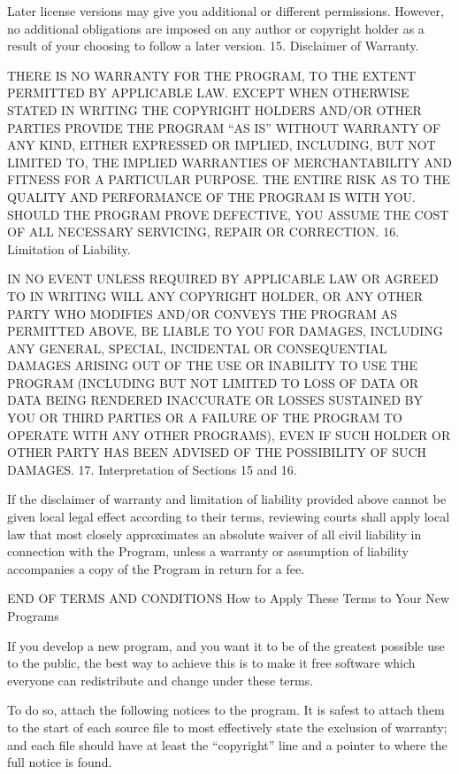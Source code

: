 {\begin{multicols}{4}
Later license versions may give you additional or different permissions. However, no additional obligations are imposed on any author or copyright holder as a result of your choosing to follow a later version.
15. Disclaimer of Warranty.

THERE IS NO WARRANTY FOR THE PROGRAM, TO THE EXTENT PERMITTED BY APPLICABLE LAW. EXCEPT WHEN OTHERWISE STATED IN WRITING THE COPYRIGHT HOLDERS AND/OR OTHER PARTIES PROVIDE THE PROGRAM “AS IS” WITHOUT WARRANTY OF ANY KIND, EITHER EXPRESSED OR IMPLIED, INCLUDING, BUT NOT LIMITED TO, THE IMPLIED WARRANTIES OF MERCHANTABILITY AND FITNESS FOR A PARTICULAR PURPOSE. THE ENTIRE RISK AS TO THE QUALITY AND PERFORMANCE OF THE PROGRAM IS WITH YOU. SHOULD THE PROGRAM PROVE DEFECTIVE, YOU ASSUME THE COST OF ALL NECESSARY SERVICING, REPAIR OR CORRECTION.
16. Limitation of Liability.

IN NO EVENT UNLESS REQUIRED BY APPLICABLE LAW OR AGREED TO IN WRITING WILL ANY COPYRIGHT HOLDER, OR ANY OTHER PARTY WHO MODIFIES AND/OR CONVEYS THE PROGRAM AS PERMITTED ABOVE, BE LIABLE TO YOU FOR DAMAGES, INCLUDING ANY GENERAL, SPECIAL, INCIDENTAL OR CONSEQUENTIAL DAMAGES ARISING OUT OF THE USE OR INABILITY TO USE THE PROGRAM (INCLUDING BUT NOT LIMITED TO LOSS OF DATA OR DATA BEING RENDERED INACCURATE OR LOSSES SUSTAINED BY YOU OR THIRD PARTIES OR A FAILURE OF THE PROGRAM TO OPERATE WITH ANY OTHER PROGRAMS), EVEN IF SUCH HOLDER OR OTHER PARTY HAS BEEN ADVISED OF THE POSSIBILITY OF SUCH DAMAGES.
17. Interpretation of Sections 15 and 16.

If the disclaimer of warranty and limitation of liability provided above cannot be given local legal effect according to their terms, reviewing courts shall apply local law that most closely approximates an absolute waiver of all civil liability in connection with the Program, unless a warranty or assumption of liability accompanies a copy of the Program in return for a fee.

END OF TERMS AND CONDITIONS
How to Apply These Terms to Your New Programs

If you develop a new program, and you want it to be of the greatest possible use to the public, the best way to achieve this is to make it free software which everyone can redistribute and change under these terms.

To do so, attach the following notices to the program. It is safest to attach them to the start of each source file to most effectively state the exclusion of warranty; and each file should have at least the “copyright” line and a pointer to where the full notice is found.


\end{multicols}}

